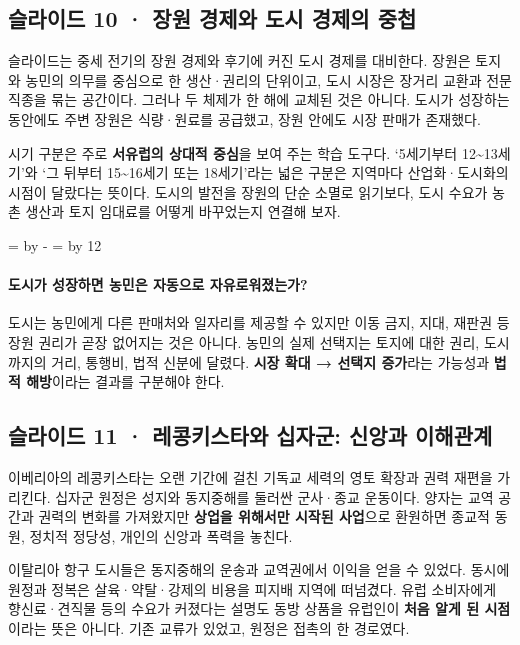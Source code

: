 \documentclass[10pt,a4paper]{article}
\newcommand{\ReserveQuestionSpace}{%
  \par\begingroup
  \dimen0=\pagegoal \advance\dimen0 by -\pagetotal
  \dimen2=\baselineskip \multiply\dimen2 by 12
  \ifdim\dimen0<\dimen2 \newpage\fi
  \endgroup}
\begin{document}
\subsection{슬라이드 10 · 장원 경제와 도시 경제의 중첩}
슬라이드는 중세 전기의 장원 경제와 후기에 커진 도시 경제를 대비한다. 장원은 토지와 농민의 의무를 중심으로 한 생산·권리의 단위이고, 도시 시장은 장거리 교환과 전문 직종을 묶는 공간이다. 그러나 두 체제가 한 해에 교체된 것은 아니다. 도시가 성장하는 동안에도 주변 장원은 식량·원료를 공급했고, 장원 안에도 시장 판매가 존재했다.\par

시기 구분은 주로 \textbf{서유럽의 상대적 중심}을 보여 주는 학습 도구다. ‘5세기부터 12\textasciitilde{}13세기’와 ‘그 뒤부터 15\textasciitilde{}16세기 또는 18세기’라는 넓은 구분은 지역마다 산업화·도시화의 시점이 달랐다는 뜻이다. 도시의 발전을 장원의 단순 소멸로 읽기보다, 도시 수요가 농촌 생산과 토지 임대료를 어떻게 바꾸었는지 연결해 보자.\par

\ReserveQuestionSpace
\paragraph{도시가 성장하면 농민은 자동으로 자유로워졌는가?}
도시는 농민에게 다른 판매처와 일자리를 제공할 수 있지만 이동 금지, 지대, 재판권 등 장원 권리가 곧장 없어지는 것은 아니다. 농민의 실제 선택지는 토지에 대한 권리, 도시까지의 거리, 통행비, 법적 신분에 달렸다. \textbf{시장 확대 → 선택지 증가}라는 가능성과 \textbf{법적 해방}이라는 결과를 구분해야 한다.\par

\subsection{슬라이드 11 · 레콩키스타와 십자군: 신앙과 이해관계}
이베리아의 레콩키스타는 오랜 기간에 걸친 기독교 세력의 영토 확장과 권력 재편을 가리킨다. 십자군 원정은 성지와 동지중해를 둘러싼 군사·종교 운동이다. 양자는 교역 공간과 권력의 변화를 가져왔지만 \textbf{상업을 위해서만 시작된 사업}으로 환원하면 종교적 동원, 정치적 정당성, 개인의 신앙과 폭력을 놓친다.\par

이탈리아 항구 도시들은 동지중해의 운송과 교역권에서 이익을 얻을 수 있었다. 동시에 원정과 정복은 살육·약탈·강제의 비용을 피지배 지역에 떠넘겼다. 유럽 소비자에게 향신료·견직물 등의 수요가 커졌다는 설명도 동방 상품을 유럽인이 \textbf{처음 알게 된 시점}이라는 뜻은 아니다. 기존 교류가 있었고, 원정은 접촉의 한 경로였다.\par
\end{document}
